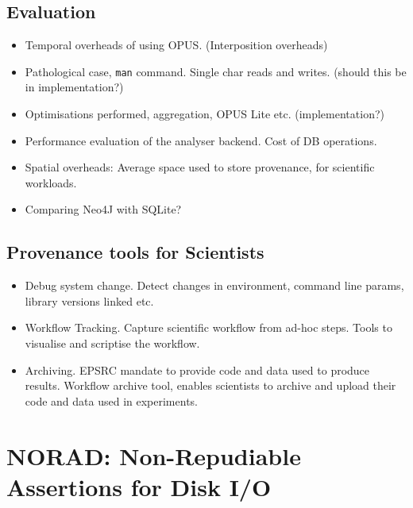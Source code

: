 \documentclass[withindex,glossary]{cam-thesis}
\begin{document}
\section{Evaluation}
\begin{itemize}
\item Temporal overheads of using OPUS. (Interposition overheads)
\item Pathological case, \texttt{man} command. Single char reads and writes. (should this be in implementation?)
\item Optimisations performed, aggregation, OPUS Lite etc. (implementation?)
\item Performance evaluation of the analyser backend. Cost of DB operations.
\item Spatial overheads: Average space used to store provenance, for scientific workloads.
\item Comparing Neo4J with SQLite?
\end{itemize}

\section{Provenance tools for Scientists}
\begin{itemize}
\item Debug system change. Detect changes in environment, command line params, library versions linked etc.
\item Workflow Tracking. Capture scientific workflow from ad-hoc steps. Tools to visualise and scriptise the workflow.
\item Archiving. EPSRC mandate to provide code and data used to produce results. Workflow archive tool, enables scientists to archive and upload their code and data used in experiments.
\end{itemize}


\chapter{NORAD: Non-Repudiable Assertions for Disk I/O}
\end{document}
